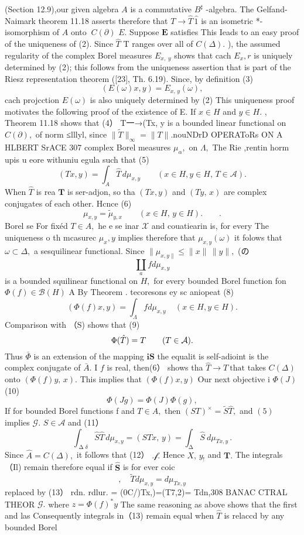 (Section 12.9),our given algebra $\textstyle A$ is a commutative $B^{\sharp}$ -algebra. The Gelfand-Naimark theorem 11.18 asserts therefore that $T\to{\hat{T}}\,{\hat{1}}$ is an isometric *-isomorphism of $\scriptstyle A$ onto $\ C(\partial)$ $E.$ Suppose ${\boldsymbol{E}}$ satisfies This Ieads to an easy proof of the uniqueness of (2). Since $\hat{T}$ T ranges over all of $C(\Delta).$ ), the assumed regularity of the complex Borel measures $E_{x,\;y}$ shows that cach $\scriptstyle{E_{x},r}$ is uniquely determined by (2); this follows from the uniqueness assertion that is part of the Riesz representation theorem ([23], Th. 6.19). Since, by definition (3) $$ (E(\omega)x,y)=E_{x,\,y}(\omega), $$ cach projcction $E(\omega)$ is also uniquely determined by (2) This uniqueness proof motivates the following proof of the existence of E. If $x\in H$ and $y\in H.$ , Theorem 11.18 shows that (4） T一→(Tx, y is a bounded linear functional on $C(\partial),$ of norm ≤lllyl, since $\|{\tilde{T}}\|_{\infty}=\|T\|.$nouNDrD OPERAToRs ON A HLBERT SrACE 307 complex Borel measures $\mu_{\alpha},$ on $\Lambda,$ The Rie ,rentin horm upis u eore withuniu egula such that (5) $$ (T x,y)=\int_{A}{\hat{T}}\,d\mu_{x,y}\qquad(x\in H,y\in H,\,T\in{\mathcal{A}}). $$ When ${\hat{T}}$ is rea ${\boldsymbol{T}}$ is ser-adjon, so tha $(T x,y)$ and $(T y,\,x)$ are complex conjugates of each other. Hcnce (6) $$ \mu_{x,y}={\widetilde\mu}_{y,x}\qquad(x\in H,\,y\in H).\qquad. $$ Borel se For fixéd $T\in A,$ he e se inar $\textstyle{\mathcal{X}}$ and couatiearin is, for every The uniqueness o th mcasurec $\textstyle\mu_{x},y$ implies therefore that $\mu_{x,y}(\omega)$ it folows that $\omega\subset\Delta,$ a sesquilinear functional. Since $\|\mu_{x,y\|}\leq\|x\|\,\|y\|,$ (の $$ \coprod_{a}f d\mu_{x,y} $$ is a bounded squilinear functional on $\textstyle H,$ for every bounded Borel function fon $\Phi(f)\in{\mathcal{B}}(H)$ A By Theorem . tecoresons ey sc aniopeat (8) $$ (\Phi(f)x,y)=\int_{\Lambda}f d\mu_{x,y}\ \ \ \ \ (x\in H,y\in H). $$ Comparison with （S) shows that (9) $$ \Phi(\hat{T})=T\qquad(T\in{\cal A}). $$ Thus $\bar{\Phi}$ is an extension of the mapping $\mathbf{i}\mathbf{S}$ the equalit is self-adioint is the complex conjugate of ${\bar{A}}.$ I $\boldsymbol{\mathit{f}}$ is real, then(6） shows tha ${\hat{T}}\to T{\mathrm{~that}}$ takes $C(\Delta)$ onto $(\Phi(f)y,\,x).$ This implies that $(\Phi(f)x,y)$ Our next objective i $\Phi(J)$ (10) $$ \Phi(J g)=\Phi(J)\Phi(g), $$ If for bounded Borel functions f and $T\in A,$ then $(S T)^{\times}=\tilde{S}\hat{T},$ and $\left(5\right)$ implies ${\mathcal{G}}.$ $S\in{\mathcal{A}}$ and (11） $$ \int_{\mathop{\Delta}{\delta}}\hat{S}\hat{T}\,d\mu_{x,y}=(S T x,\,y)=\int_{\mathop{\Delta}}\hat{S}\ d\mu_{T x,y}\,. $$ Since ${\hat{A}}=C(\Delta),$ it follows that (12） ${\big.}{\mathcal{f}}.$ Hence $X,\,y_{!}$ and ${\boldsymbol{T}}.$ The integrals （Il) remain therefore equal if $\hat{\boldsymbol{S}}$ is for ever coic $$ ,\quad\tilde{T}d\mu_{x,y}=d\mu_{T x,y} $$ replaced by (13） rdn. rdlur. = (0C/)Tx,)=(T7,2)= Tdn,308 BANAC CTRAL THEOR ${\mathcal{G}}.$ where $z=\Phi(f)^{*}y$ The same reasoning as above shows that the first and las Consequently integrals in（13) remain equal when $\hat{T}$ is relaccd by any bounded Borel 